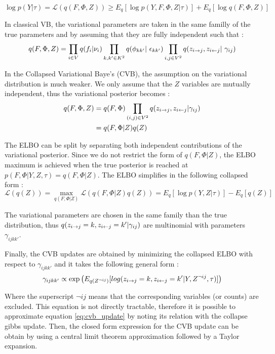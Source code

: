 \begin{equation}
\log p(Y | \tau) = \mathcal{L}(q(F, \Phi, Z)) \geq E_q[\log p(Y, F, \Phi, Z | \tau)] + E_q[\log q(F, \Phi, Z)]
\end{equation}

In classical VB, the variational parameters are taken in the same familly of the true parameters and by assuming that they are fully independent such that :
\begin{equation}
q(F, \Phi, Z) = \prod_{i\in V}q(f_i | \nu_i) \prod_{k,k' \in K^2}q(\phi_{kk'} | \epsilon_{kk'})\prod_{i,j \in V^2}q(\zij, \zji | \gamma_{ij})
\end{equation}

In the Collapsed Variational Baye's (CVB), the assumption on the variational distribution is much weaker. We only assume that the $Z$ variables are mutually independent, thus the variational posterior becomes : 
\begin{align}
q(F, \Phi, Z) &= q(F,\Phi) \prod_{(i,j)\in V^2}q(z_{i\rightarrow j}, z_{i\leftarrow j} | \gamma_{ij}) \\
	&= q(F, \Phi | Z)q(Z)
\end{align}

The ELBO can be split by separating both independent contributions of the variational posterior. Since we do not restrict the form of $q(F, \Phi | Z)$, the ELBO maximum is achieved when the true posterior is reached at $p(F, \Phi | Y, Z,  \tau) = q(F, \Phi | Z)$. The ELBO simplifies in the following collapsed form :
\begin{equation}
\mathcal{L}(q(Z)) = \max_{q(F,\Phi|Z)} \mathcal{L}(q(F, \Phi|Z)q(Z)) = E_q[\log p(Y,Z|\tau)] - E_q[q(Z)]
\end{equation}

The variational parameters are chosen in the same family than the true distribution, thus $q(z_{i\rightarrow j}=k, z_{i\leftarrow j}=k' | \gamma_{ij})$ are multinomial with parameters $\gamma_{ijkk'}$.

Finally, the CVB updates are obtained by minimizing the collapsed ELBO with respect to $\gamma_{ijkk'}$ and it takes the following general form :
\begin{equation} \label{eq:cvb_update}
    \gamma_{ijkk'} \propto \exp \left( E_{q(Z^{\neg ij})} [log(z_{i\rightarrow j}=k, z_{i\leftarrow j}=k' |Y, Z^{\neg ij}, \tau)] \right)
\end{equation}

Where the superscript $\neg ij$ means that the corresponding variables (or counts) are excluded.
This equation is not directly tractable, therefore it is possible to approximate equation \eqref{eq:cvb_update} by noting its relation with the collapse gibbs update. Then,  the closed form expression for the CVB update can be obtain by using a central limit theorem approximation followed by a Taylor expansion.



